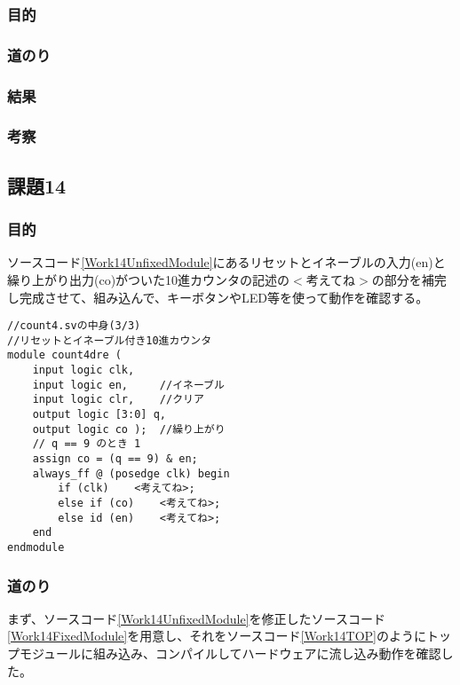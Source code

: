 \documentclass[a4paper]{jarticle}
\begin{document}
\subsubsection{目的}
\subsubsection{道のり}
\subsubsection{結果}
\subsubsection{考察}
\subsection{課題14}
\subsubsection{目的}
ソースコード\ref{Work14UnfixedModule}にあるリセットとイネーブルの入力(en)と繰り上がり出力(co)がついた10進カウンタの記述の$<$考えてね$>$の部分を補完し完成させて、組み込んで、キーボタンやLED等を使って動作を確認する。
\begin{lstlisting}[caption=count4.sv,label=Work14UnfixedModule]
//count4.svの中身(3/3)
//リセットとイネーブル付き10進カウンタ
module count4dre (
	input logic clk,
	input logic en,		//イネーブル
	input logic clr,	//クリア
	output logic [3:0] q,
	output logic co );	//繰り上がり
	// q == 9 のとき 1
	assign co = (q == 9) & en;
	always_ff @ (posedge clk) begin
		if (clk)	<考えてね>;
		else if (co)	<考えてね>;
		else id (en)	<考えてね>;
	end
endmodule
\end{lstlisting}
\subsubsection{道のり}
まず、ソースコード\ref{Work14UnfixedModule}を修正したソースコード\ref{Work14FixedModule}を用意し、それをソースコード\ref{Work14TOP}のようにトップモジュールに組み込み、コンパイルしてハードウェアに流し込み動作を確認した。


\end{document}
